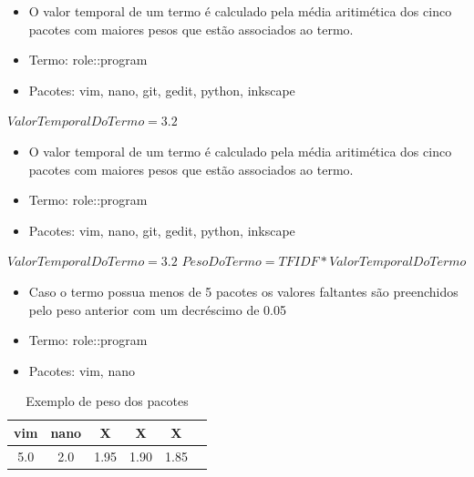 \begin{frame}
    \begin{itemize}
        \item O valor temporal de um termo é calculado pela média aritimética dos cinco
pacotes com maiores pesos que estão associados
ao termo.
        \item Termo: role::program
        \item Pacotes: vim, nano, git, gedit, python, inkscape
    \end{itemize}

    $ValorTemporalDoTermo = 3.2$
\end{frame}

\begin{frame}
    \begin{itemize}
        \item O valor temporal de um termo é calculado pela média aritimética dos cinco
pacotes com maiores pesos que estão associados
ao termo.
        \item Termo: role::program
        \item Pacotes: vim, nano, git, gedit, python, inkscape
    \end{itemize}

    $ValorTemporalDoTermo = 3.2$
    $PesoDoTermo = TFIDF * ValorTemporalDoTermo$
\end{frame}

\begin{frame}
    \begin{itemize}
        \item Caso o termo possua menos de 5 pacotes os valores faltantes são
    preenchidos pelo peso anterior com um decréscimo de 0.05
        \item Termo: role::program
        \item Pacotes: vim, nano
    \end{itemize}

    \begin{table}[h]
    \centering
    \begin{tabular}{cccccc}
    \hline
    \rowcolor[HTML]{EFEFEF}
    {vim} & {nano} & {X} & {X} & {X} \\ \hline
    {5.0} & {2.0} & {1.95} & {1.90} & {1.85} \\ \hline
    \end{tabular}
    \caption{Exemplo de peso dos pacotes}
    \label{tab:classificacao_pacotes}
    \end{table}
\end{frame}


